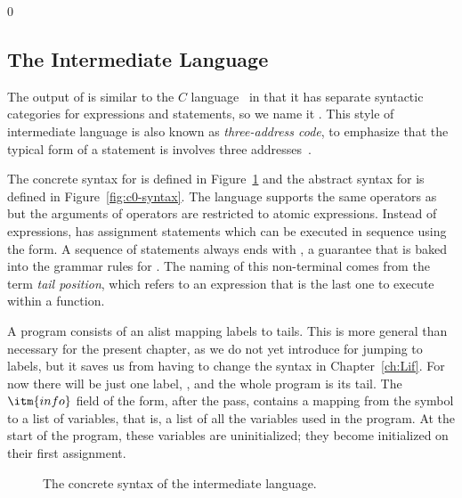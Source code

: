 \documentclass[7x10,nocrop]{TimesAPriori_MIT}%
\def\racketEd{0}
\def\edition{1}
\begin{document}
{\if\edition\racketEd  
\subsection{The \LangCVar{} Intermediate Language}

The output of  is similar to the $C$
language~\citep{Kernighan:1988nx} in that it has separate syntactic
categories for expressions and statements, so we name it \LangCVar{}.
This style of intermediate language is also known as
\emph{three-address code}, to emphasize that the typical form of a
statement is  involves three
addresses~\citep{Aho:2006wb}.

The concrete syntax for \LangCVar{} is defined in
Figure~\ref{fig:c0-concrete-syntax} and the abstract syntax for
\LangCVar{} is defined in Figure~\ref{fig:c0-syntax}.
%
The \LangCVar{} language supports the same operators as \LangVar{} but
the arguments of operators are restricted to atomic
expressions. Instead of  expressions, \LangCVar{} has
assignment statements which can be executed in sequence using the
 form. A sequence of statements always ends with
, a guarantee that is baked into the grammar rules for
. The naming of this non-terminal comes from the term
\emph{tail position}, which refers to an
expression that is the last one to execute within a function.

A \LangCVar{} program consists of an alist mapping labels to
tails. This is more general than necessary for the present chapter, as
we do not yet introduce  for jumping to labels, but it saves
us from having to change the syntax in Chapter~\ref{ch:Lif}.  For now
there will be just one label, , and the whole program is
its tail.
%
The $\itm{info}$ field of the  form, after the
 pass, contains a mapping from the symbol
 to a list of variables, that is, a list of all the
variables used in the program. At the start of the program, these
variables are uninitialized; they become initialized on their first
assignment.

\begin{figure}[tbp]
\caption{The concrete syntax of the \LangCVar{} intermediate language.}
\label{fig:c0-concrete-syntax}
\end{figure}


}
\end{document}

